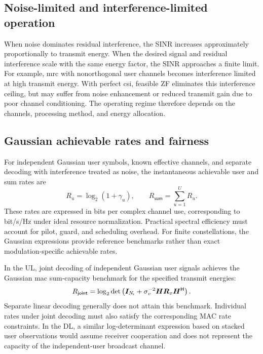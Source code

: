 \subsection{Noise-limited and interference-limited operation}
When noise dominates residual interference, the SINR increases approximately proportionally to transmit energy. When the desired signal and residual interference scale with the same energy factor, the SINR approaches a finite limit. For example, \ac{mrc} with nonorthogonal user channels becomes interference limited at high transmit energy. With perfect \ac{csi}, feasible ZF eliminates this interference ceiling, but may suffer from noise enhancement or reduced transmit gain due to poor channel conditioning. The operating regime therefore depends on the channels, processing method, and energy allocation.

\subsection{Gaussian achievable rates and fairness}
For independent Gaussian user symbols, known effective channels, and separate decoding with interference treated as noise, the instantaneous achievable user and sum rates are
\begin{equation}
	R_u=\log_2(1+\gamma_u),
	\qquad
	R_{\mathsf{sum}}=\sum_{u=1}^{U}R_u.
	\label{eq:rates}
\end{equation}
These rates are expressed in bits per complex channel use, corresponding to bit/s/Hz under ideal resource normalization. Practical spectral efficiency must account for pilot, guard, and scheduling overhead. For finite constellations, the Gaussian expressions provide reference benchmarks rather than exact modulation-specific achievable rates.

In the UL, joint decoding of independent Gaussian user signals achieves the Gaussian \ac{mac} sum-capacity benchmark for the specified transmit energies:
\begin{equation}
	R_{\mathsf{joint}}
	=\log_2\det\left(
	\bm{I}_{N_{\mathsf{r}}}
	+\sigma_v^{-2}\bm{H}\bm{R}_x{\bm{H}}^{\mathsf{H}}
	\right).
	\label{eq:macsum}
\end{equation}
Separate linear decoding generally does not attain this benchmark. Individual rates under joint decoding must also satisfy the corresponding MAC rate constraints. In the DL, a similar log-determinant expression based on stacked user observations would assume receiver cooperation and does not represent the capacity of the independent-user broadcast channel.

